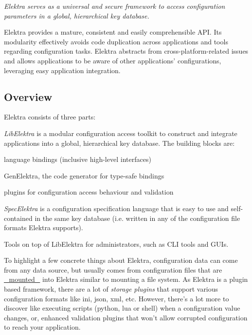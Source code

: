 {\itshape Elektra serves as a universal and secure framework to access configuration parameters in a global, hierarchical key database.}



Elektra provides a mature, consistent and easily comprehensible A\+P\+I. Its modularity effectively avoids code duplication across applications and tools regarding configuration tasks. Elektra abstracts from cross-\/platform-\/related issues and allows applications to be aware of other applications' configurations, leveraging easy application integration.

\subsection*{Overview}

Elektra consists of three parts\+:


\begin{DoxyEnumerate}
\item {\itshape Lib\+Elektra} is a modular configuration access toolkit to construct and integrate applications into a global, hierarchical key database. The building blocks are\+:
\begin{DoxyItemize}
\item language bindings (inclusive high-\/level interfaces)
\item Gen\+Elektra, the code generator for type-\/safe bindings
\item plugins for configuration access behaviour and validation
\end{DoxyItemize}
\item {\itshape Spec\+Elektra} is a configuration specification language that is easy to use and self-\/contained in the same key database (i.\+e. written in any of the configuration file formats Elektra supports).
\item Tools on top of Lib\+Elektra for administrators, such as C\+L\+I tools and G\+U\+Is.
\end{DoxyEnumerate}

To highlight a few concrete things about Elektra, configuration data can come from any data source, but usually comes from configuration files that are \hyperlink{md_doc_help_elektra-mounting_doc_help_elektra-mounting_md}{\+\_\+mounted\+\_\+} into Elektra similar to mounting a file system. As Elektra is a plugin based framework, there are a lot of {\itshape storage plugins} that support various configuration formats like ini, json, xml, etc. However, there's a lot more to discover like executing scripts ({\ttfamily python}, {\ttfamily lua} or {\ttfamily shell}) when a configuration value changes, or, enhanced validation plugins that won't allow corrupted configuration to reach your application.

